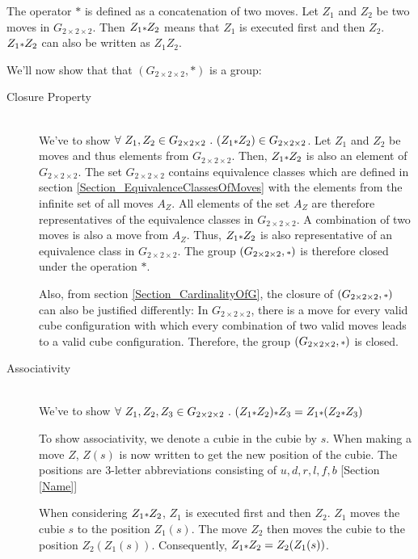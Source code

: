 \documentclass[12pt,a4paper]{article}
\theoremstyle{custom}
\newcommand{\Gtwo}{\ensuremath{G_{2\times 2\times 2}}}
\begin{document}
The operator $\scriptstyle*$ is defined as a concatenation of two moves. Let $Z_1$ and $Z_2$ be two moves in $\Gtwo$. Then $Z_1 \mathlarger{\scriptstyle*} Z_2$ means that $Z_1$ is executed first and then $Z_2$. $Z_1 \mathlarger{\scriptstyle*} Z_2$ can also be written as $Z_1Z_2$.

We'll now show that  that $\left(\Gtwo, \scriptstyle*\right)$ is a group: 


\begin{description}
\item [Closure Property] \ \\
We've to show $\forall \ Z_1,Z_2 \in \Gtwo \ . \ (Z_1 \mathlarger{\scriptstyle *} Z_2) \in G_{2\times 2\times 2}$. Let $Z_1$ and $Z_2$ be moves and thus elements from $\Gtwo$. Then, $Z_1 \mathlarger{\scriptstyle*} Z_2$ is also an element of $\Gtwo$. The set $\Gtwo$ contains equivalence classes which are defined in section \ref{Section_EquivalenceClassesOfMoves} with the elements from the infinite set of all moves $A_Z$. All elements of the set $A_Z$ are therefore representatives of the equivalence classes in $\Gtwo$. A combination of two moves is also a move from $A_Z$. Thus, $Z_1 \mathlarger{\scriptstyle*} Z_2$ is also representative of an equivalence class in $\Gtwo$. The group $\left(\Gtwo, \mathlarger{\scriptstyle*}\right)$ is therefore closed under the operation $\scriptstyle*$.
 
Also, from section \ref{Section_CardinalityOfG}, the closure of $(\Gtwo, \mathlarger{\scriptstyle*})$ can also be justified differently: In $\Gtwo$, there is a move for every valid cube configuration with which every combination of two valid moves leads to a valid cube configuration. Therefore, the group $\left(\Gtwo, \mathlarger{\scriptstyle*}\right)$ is closed.


\item [Associativity] \ \\
We've to show $\forall \ Z_1,Z_2,Z_3 \in \Gtwo \ . \ (Z_1 \mathlarger{\scriptstyle*} Z_2) \mathlarger{\scriptstyle*} Z_3 = Z_1 \mathlarger{\scriptstyle*} (Z_2 \mathlarger{\scriptstyle*} Z_3)$

To show associativity, we denote a cubie in the cubie by $s$. When making a move $Z$, $Z(s)$ is now written to get the new position of the cubie. The positions are 3-letter abbreviations consisting of $u, d, r, l, f, b$ [Section \ref{Name}]

When considering $Z_1 \mathlarger{\scriptstyle*} Z_2 $, $Z_1$ is executed first and then $Z_2$. $Z_1$ moves the cubie $s$ to the position $Z_1(s)$. The move $Z_2$ then moves the cubie to the position $Z_2(Z_1(s))$. Consequently, $Z_1 \mathlarger{\scriptstyle*} Z_2 = Z_2(Z_1(s))$.



\end{description}
\end{document}
